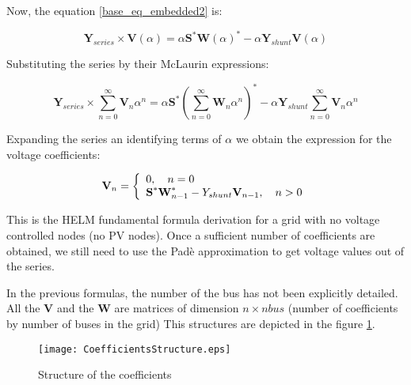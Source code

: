 \documentclass[11pt,fleqn]{book} %
\begin{document}
Now, the equation \ref{base_eq_embedded2} is:

\begin{equation}
{\textbf{Y}_{series}\times \textbf{V}( \alpha )} = \alpha\textbf{S}^* \textbf{W}( \alpha)^*  - \alpha \textbf{Y}_{shunt} \textbf{V}( \alpha )
\label{base_eq_embedded3}
\end{equation}

Substituting the series by their McLaurin expressions:

\begin{equation}
{\textbf{Y}_{series}\times \sum_{n=0}^{\infty}{\textbf{V}_n \alpha^n}} = \alpha\textbf{S}^* \left(\sum_{n=0}^{\infty}{\textbf{W}_n \alpha^n}\right)^*  - \alpha \textbf{Y}_{shunt} \sum_{n=0}^{\infty}{\textbf{V}_n \alpha^n}
\label{base_eq_embedded4}
\end{equation}

Expanding the series an identifying terms of $\alpha$ we obtain the expression for the voltage coefficients:

\begin{equation}
\textbf{V}_n =
\left\{
	\begin{array}{ll}
		\mathlarger{0}, \quad n=0\\
		\mathlarger{\textbf{S}^* \textbf{W}^*_{n-1} - Y_{shunt} \textbf{V}_{n-1} }, \quad n>0
	\end{array}
\right.
\end{equation}

This is the HELM fundamental formula derivation for a grid with no voltage controlled nodes (no PV nodes). Once a sufficient number of coefficients are obtained, we still need to use the Padè approximation to get voltage values out of the series.


In the previous formulas, the number of the bus has not been explicitly detailed. All the $\textbf{V}$ and the $\textbf{W}$ are matrices of dimension $n \times nbus$ (number of coefficients by number of buses in the grid) This structures are depicted in the figure \ref{fig:CoefficientsStructure}.


\begin{figure}[h]
	\centering
	\texttt{[image: CoefficientsStructure.eps]}
	\caption{Structure of the coefficients}
	\label{fig:CoefficientsStructure}
\end{figure}



\end{document}
